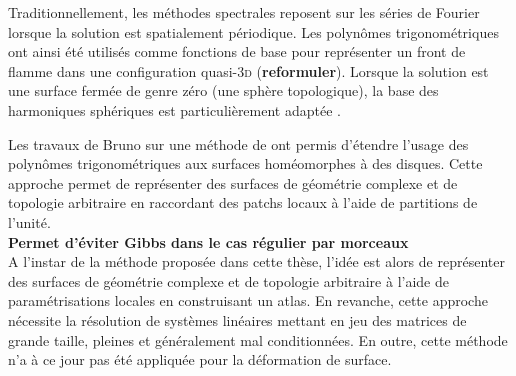 Traditionnellement, les méthodes spectrales reposent sur les séries de Fourier lorsque la solution est spatialement périodique. 
Les polynômes trigonométriques ont ainsi été utilisés comme fonctions de base pour représenter un front de flamme dans une configuration quasi-3{\scshape d} \cite{gueyffier2015} (\textbf{reformuler}).
Lorsque la solution est une surface fermée de genre zéro (\ie une sphère topologique), la base des harmoniques sphériques est particulièrement adaptée \cite{veerapaneni2011}.\par
Les travaux de Bruno \cite{bruno2007} sur une méthode de  ont permis d'étendre l'usage des polynômes trigonométriques aux surfaces homéomorphes à des disques. 
Cette approche permet de représenter des surfaces de géométrie complexe et de topologie arbitraire en raccordant des patchs locaux à l'aide de partitions de l'unité.\\
\textbf{Permet d'éviter Gibbs dans le cas régulier par morceaux}\\
A l'instar de la méthode proposée dans cette thèse, l'idée est alors de représenter des surfaces de géométrie complexe et de topologie arbitraire à l'aide de paramétrisations locales en construisant un atlas. 
En revanche, cette approche nécessite la résolution de systèmes linéaires mettant en jeu des matrices de grande taille, pleines et généralement mal conditionnées. 
En outre, cette méthode n'a à ce jour pas été appliquée pour la déformation de surface.

